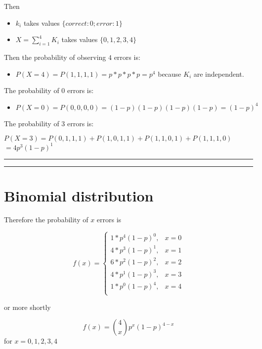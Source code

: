 \documentclass[
]{book}
\providecommand{\tightlist}{%
  \setlength{\itemsep}{0pt}\setlength{\parskip}{0pt}}
\begin{document}
Then

\begin{itemize}
\item
  \(k_i\) takes values \(\{correct:0; error:1\}\)
\item
  \(X=\sum_{i=1}^4 K_i\) takes values \(\{0,1,2,3,4\}\)
\end{itemize}

Then the probability of observing \(4\) errors is:

\begin{itemize}
\tightlist
\item
  \(P(X=4)=P(1,1,1,1)=p*p*p*p=p^4\) because \(K_i\) are independent.
\end{itemize}

The probability of \(0\) errors is:

\begin{itemize}
\tightlist
\item
  \(P(X=0)=P(0,0,0,0)=(1-p)(1-p)(1-p)(1-p)=(1-p)^4\)
\end{itemize}

The probability of \(3\) errors is:

\(P(X=3)=P(0,1,1,1)+P(1,0,1,1)+P(1,1,0,1)+P(1,1,1,0)\)
\(=4p^3(1-p)^1\)

\begin{center}\rule{0.5\linewidth}{0.5pt}\end{center}

\begin{center}\rule{0.5\linewidth}{0.5pt}\end{center}

\hypertarget{binomial-distribution-2}{%
\section{Binomial distribution}\label{binomial-distribution-2}}

Therefore the probability of \(x\) errors is

\[
    f(x)= 
\begin{cases}
    1*p^4(1-p)^0,&  x=0 \\
    4*p^3(1-p)^1,&    x=1 \\
    6*p^2(1-p)^2,&  x=2 \\
    4*p^1(1-p)^3,&  x=3 \\
    1*p^0(1-p)^4,&  x=4 \\
\end{cases}
\]

or more shortly

\[f(x)=\binom 4 x p^x(1-p)^{4-x}\]
for \(x=0,1,2,3,4\)
\end{document}
